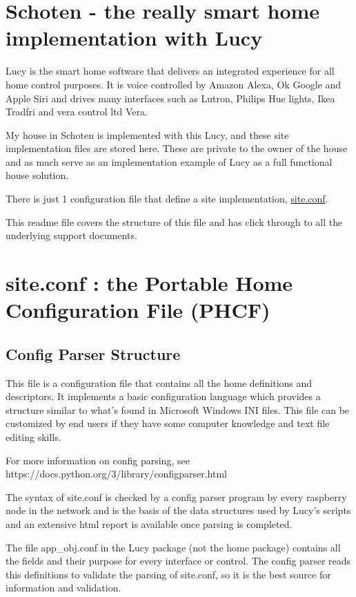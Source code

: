 
\usepackage{tabu}




\section{Schoten - the really smart home implementation with Lucy}

Lucy is the smart home software that delivers an integrated experience
for all home control purposes. It is voice controlled by Amazon Alexa,
Ok Google and Apple Siri and drives many interfaces such as Lutron,
Philips Hue lights, Ikea Tradfri and vera control ltd Vera.

My house in Schoten is implemented with this Lucy, and these site
implementation files are stored here. These are private to the owner of
the house and as much serve as an implementation example of Lucy as a
full functional house solution.

There is just 1 configuration file that define a site implementation,
\url{site.conf}.

This readme file covers the structure of this file and has click through
to all the underlying support documents.

\section{site.conf : the Portable Home Configuration File (PHCF)}

\subsection{Config Parser Structure}

This file is a configuration file that contains all the home definitions
and descriptors. It implements a basic configuration language which
provides a structure similar to what’s found in Microsoft Windows INI
files. This file can be customized by end users if they have some
computer knowledge and text file editing skills.

For more information on config parsing, see
https://docs.python.org/3/library/configparser.html

The syntax of site.conf is checked by a config parser program by every
raspberry node in the network and is the basis of the data structures
used by Lucy's scripts and an extensive html report is available once
parsing is completed.

The file app\_obj.conf in the Lucy package (not the home package)
contains all the fields and their purpose for every interface or
control. The config parser reads this definitions to validate the
parsing of site.conf, so it is the best source for information and
validation.

